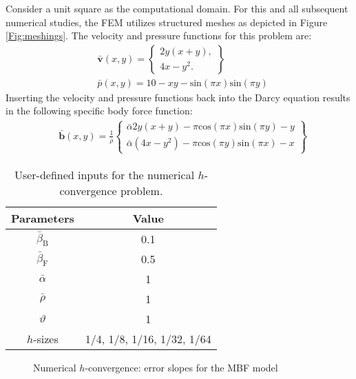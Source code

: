 \documentclass[11pt,reqno]{amsart}
\begin{document}
Consider a unit square as the computational domain. For this and all subsequent 
numerical studies, the FEM utilizes structured meshes as depicted in 
Figure \ref{Fig:meshings}. The velocity and pressure functions for this problem are:
\begin{subequations}
\begin{align}
  & \mathbf{\bar{v}}(x,y) = 
  \begin{Bmatrix}
	2y(x+y), \\
	4x-y^{2}.
  \end{Bmatrix} \\
  & \bar{p}(x,y) = 10-xy-\mathrm{sin}(\pi x )\mathrm{sin}(\pi y)
\end{align}
\label{Eqn:numerical_h}
\end{subequations}
Inserting the velocity and pressure functions back into the Darcy equation results in the following specific body force function:
\begin{align}
  & \mathbf{\bar{b}}(x,y) = \frac{1}{\bar{\rho}}
  \begin{Bmatrix}
    \bar{\alpha} 2y(x+y)-\pi\mathrm{cos}(\pi x )\mathrm{sin}(\pi y)-y\\
    \bar{\alpha}(4x-y^{2})-\pi\mathrm{cos}(\pi y )\mathrm{sin}(\pi x)-x
  \end{Bmatrix}
\end{align}
\begin{table}[h!]
  \centering
  \caption{User-defined inputs for the numerical $h$-convergence problem.}
  \begin{tabular}{cc}
    \hline
    Parameters & Value \\
    \hline
    $\bar{\beta}_{\mathrm{B}}$ & 0.1 \\
    $\bar{\beta}_{\mathrm{F}}$ & 0.5 \\
    $\bar{\alpha}$ & 1 \\
    $\bar{\rho}$ & 1 \\
    $\vartheta$ & 1 \\
    $h$-sizes & 1/4, 1/8, 1/16, 1/32, 1/64 \\
    \hline
  \end{tabular}
  \label{Tab:h_converge}
\end{table}
\begin{figure}[t!]
  \centering
  \caption{Numerical $h$-convergence: error slopes for the MBF model}
  \label{Fig:Numerical_slopes_MBF}
\end{figure}
\end{document}

